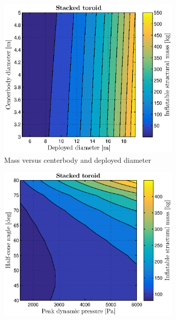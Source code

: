 \begin{figure}[h]
	\centering

	\begin{subfigure}[b]{0.49\textwidth}
		\includegraphics[width=0.96\textwidth]{./Figure/Structure/diameters_test.eps}
		\caption{Mass versus centerbody and deployed diameter}
		\label{fig:diameters_strucmass}
	\end{subfigure}
	\begin{subfigure}[b]{0.49\textwidth}
		\includegraphics[width=0.96\textwidth]{./Figure/Structure/halfcone_test.eps}

\end{subfigure}
\end{figure}

